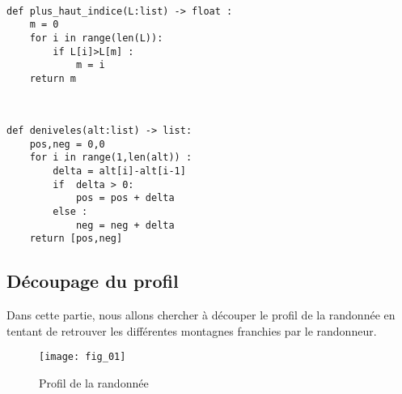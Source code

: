 \ifprof
\begin{corrige}~\\
\vspace{-.5cm}
\begin{lstlisting}
def plus_haut_indice(L:list) -> float :
    m = 0
    for i in range(len(L)):
        if L[i]>L[m] :
            m = i  
    return m
\end{lstlisting}
\end{corrige}
\else
\fi




\ifprof
\begin{corrige}~\\
\vspace{-.5cm}
\begin{lstlisting}
def deniveles(alt:list) -> list:
    pos,neg = 0,0
    for i in range(1,len(alt)) : 
        delta = alt[i]-alt[i-1]
        if  delta > 0: 
            pos = pos + delta
        else : 
            neg = neg + delta
    return [pos,neg]
\end{lstlisting}
\end{corrige}
\else
\fi




\subsection{Découpage du profil}

\ifprof
\else
Dans cette partie, nous allons chercher à découper le profil de la randonnée en tentant de retrouver les différentes montagnes franchies par le randonneur.

\begin{figure}[H]
\centering
\texttt{[image: fig\_01]}
\caption{Profil de la randonnée}
\end{figure}
\fi

